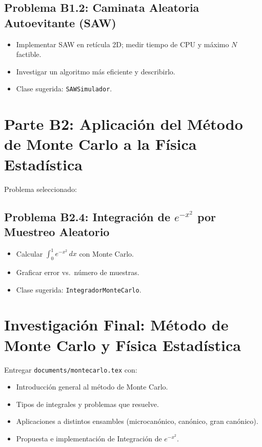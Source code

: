 \documentclass[11pt]{article}
\begin{document}
\subsection{Problema B1.2: Caminata Aleatoria Autoevitante (SAW)}

\begin{itemize}
  \item Implementar SAW en retícula 2D; medir tiempo de CPU y máximo $N$ factible.
  \item Investigar un algoritmo más eficiente y describirlo.
  \item Clase sugerida: \texttt{SAWSimulador}.
\end{itemize}


\section{Parte B2: Aplicación del Método de Monte Carlo a la Física Estadística}
Problema seleccionado:
\subsection{Problema B2.4: Integración de $e^{-x^2}$ por Muestreo Aleatorio}

\begin{itemize}
  \item Calcular $\displaystyle\int_0^1 e^{-x^2}\,dx$ con Monte Carlo.
  \item Graficar error vs.\ número de muestras.
  \item Clase sugerida: \texttt{IntegradorMonteCarlo}.
\end{itemize}

\section*{Investigación Final: Método de Monte Carlo y Física Estadística}

Entregar \texttt{documents/montecarlo.tex} con:
\begin{itemize}
  \item Introducción general al método de Monte Carlo.
  \item Tipos de integrales y problemas que resuelve.
  \item Aplicaciones a distintos ensambles (microcanónico, canónico, gran canónico).
  \item Propuesta e implementación de Integración de $e^{-x^2}$.
\end{itemize}
\end{document}
